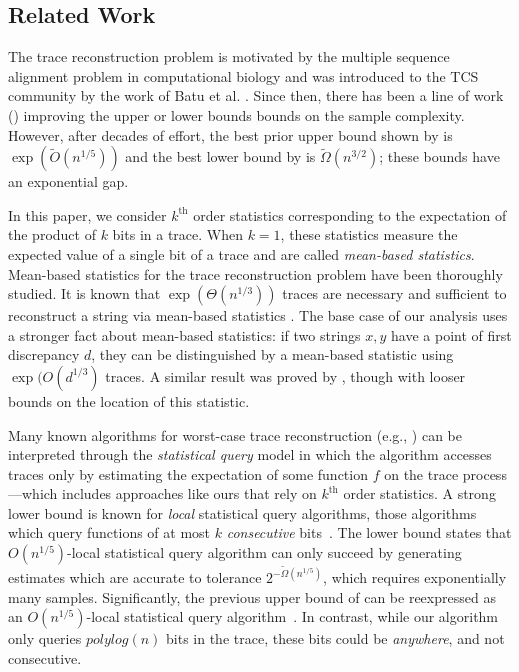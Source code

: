 \documentclass[11pt]{article}
\theoremstyle{plain}
\begin{document}
\subsection{Related Work}
\label{sec:related}

The trace reconstruction problem is motivated by the multiple sequence alignment problem in computational biology and was introduced to the TCS community by the work of Batu et al. \cite{Batu2004reconstruct}. Since then, there has been a line of work (\cite{holenstein08trace, de2019optimal,nazarov16Trace,holden20Lower,chase2021new,chase2021separating}) improving the upper or lower bounds bounds on the sample complexity. However, after decades of effort, the best prior upper bound shown by \cite{chase2021separating} is $\exp(\tilde{O}(n^{1/5}))$ and the best lower bound by \cite{chase2021new} is $\tilde{\Omega}(n^{3/2})$; these bounds have an exponential gap. 

In this paper, we consider $k^{\textrm{th}}$ order statistics corresponding to the expectation of the product of $k$ bits in a trace. When $k=1$, these statistics measure the expected value of a single bit of a trace and are called \emph{mean-based statistics}. Mean-based statistics for the trace reconstruction problem have been thoroughly studied. It is known that $\exp(\Theta(n^{1/3}))$ traces are necessary and sufficient to reconstruct a string via mean-based statistics \cite{de2019optimal,nazarov16Trace}. The base case of our analysis uses a stronger fact about mean-based statistics: if two strings $x,y$ have a point of first discrepancy $d$, they can be distinguished by a mean-based statistic using $\exp(O(d^{1/3})$ traces. A similar result was proved by \cite{peres17Average}, though with looser bounds on the location of this statistic.

Many known algorithms for worst-case trace reconstruction (e.g., \cite{holenstein08trace, de2019optimal,nazarov16Trace}) can be interpreted through the \emph{statistical query} model in which the algorithm accesses traces only by estimating the expectation of some function $f$ on the trace process---which includes approaches like ours that rely on $k^{\textrm{th}}$ order statistics. A strong lower bound is known for \emph{local} statistical query algorithms, those algorithms which query functions of at most $k$ \textit{consecutive} bits~\cite{kuan24on,chen24trace}. The lower bound states that $O(n^{1/5})$-local statistical query algorithm can only succeed by generating estimates which are accurate to tolerance $2^{-\tilde{\Omega}(n^{1/5})}$, which requires exponentially many samples. Significantly, the previous upper bound of \cite{chase2021separating} can be reexpressed as an $O(n^{1/5})$-local statistical query algorithm~\cite{chen24trace}. In contrast, while our algorithm only queries $polylog(n)$ bits in the trace, these bits could be \emph{anywhere}, and not consecutive.
\end{document}
